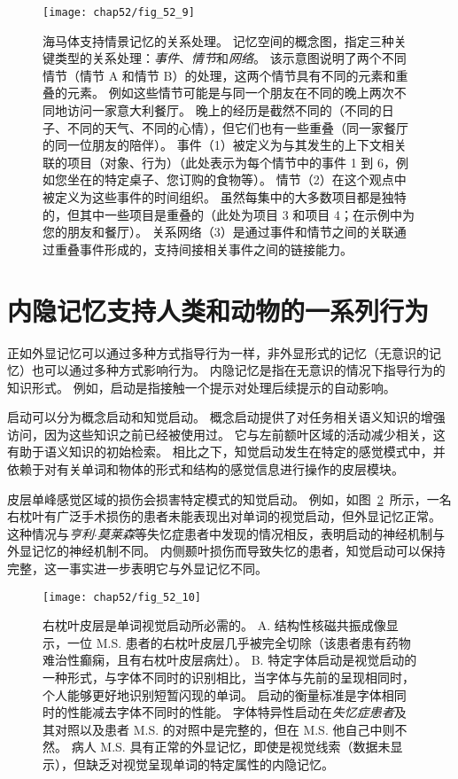 \begin{figure}[htbp]
	\centering
	\texttt{[image: chap52/fig\_52\_9]}
	\caption{海马体支持情景记忆的关系处理。
		记忆空间的概念图，指定三种关键类型的关系处理：\textit{事件}、\textit{情节}和\textit{网络}。
		该示意图说明了两个不同情节（情节 A 和情节 B）的处理，这两个情节具有不同的元素和重叠的元素。
		例如这些情节可能是与同一个朋友在不同的晚上两次不同地访问一家意大利餐厅。
		晚上的经历是截然不同的（不同的日子、不同的天气、不同的心情），但它们也有一些重叠（同一家餐厅的同一位朋友的陪伴）。
		事件（1）被定义为与其发生的上下文相关联的项目（对象、行为）（此处表示为每个情节中的事件 1 到 6，例如您坐在的特定桌子、您订购的食物等）。
		情节（2）在这个观点中被定义为这些事件的时间组织。
		虽然每集中的大多数项目都是独特的，但其中一些项目是重叠的（此处为项目 3 和项目 4；在示例中为您的朋友和餐厅）。
		关系网络（3）是通过事件和情节之间的关联通过重叠事件形成的，支持间接相关事件之间的链接能力\cite{eichenbaum2014can}。 }
	\label{fig:52_9}
\end{figure}



\section{内隐记忆支持人类和动物的一系列行为}

正如外显记忆可以通过多种方式指导行为一样，非外显形式的记忆（无意识的记忆）也可以通过多种方式影响行为。
内隐记忆是指在无意识的情况下指导行为的知识形式。
例如，启动是指接触一个提示对处理后续提示的自动影响。


启动可以分为概念启动和知觉启动。
概念启动提供了对任务相关语义知识的增强访问，因为这些知识之前已经被使用过。
它与左前额叶区域的活动减少相关，这有助于语义知识的初始检索。
相比之下，知觉启动发生在特定的感觉模式中，并依赖于对有关单词和物体的形式和结构的感觉信息进行操作的皮层模块。


皮层单峰感觉区域的损伤会损害特定模式的知觉启动。
例如，如图~\ref{fig:52_10}~所示，一名右枕叶有广泛手术损伤的患者未能表现出对单词的视觉启动，但外显记忆正常。
这种情况与\textit{亨利$\cdot$莫莱森}等失忆症患者中发现的情况相反，表明启动的神经机制与外显记忆的神经机制不同。
内侧颞叶损伤而导致失忆的患者，知觉启动可以保持完整，这一事实进一步表明它与外显记忆不同。


\begin{figure}[htbp]
	\centering
	\texttt{[image: chap52/fig\_52\_10]}
	\caption{右枕叶皮层是单词视觉启动所必需的\cite{vaidya1998font}。
		A. 结构性核磁共振成像显示，一位 M.S. 患者的右枕叶皮层几乎被完全切除（该患者患有药物难治性癫痫，且有右枕叶皮层病灶）。
		B. 特定字体启动是视觉启动的一种形式，与字体不同时的识别相比，当字体与先前的呈现相同时，个人能够更好地识别短暂闪现的单词。
		启动的衡量标准是字体相同时的性能减去字体不同时的性能。
		字体特异性启动在\textit{失忆症患者}及其对照以及患者 M.S. 的对照中是完整的，但在 M.S. 他自己中则不然。
		病人 M.S. 具有正常的外显记忆，即使是视觉线索（数据未显示），但缺乏对视觉呈现单词的特定属性的内隐记忆。}
	\label{fig:52_10}
\end{figure}



